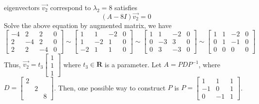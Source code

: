 \documentclass{article}
\begin{document}
eigenvectors $\Vec{v_2}$ correspond to $\lambda_2=8$ satisfies
\[(A-8I)\Vec{v_2}=0\]
Solve the above equation by augmented matrix, we have
\[\left[\begin{array}{rrrr}
-4 & 2 & 2 & 0 \\
2 & -4 & 2 & 0 \\
2 & 2 & -4 & 0
\end{array}\right]\sim\left[\begin{array}{rrrr}
1 & 1 & -2 & 0 \\
1 & -2 & 1 & 0 \\
-2 & 1 & 1 & 0
\end{array}\right]\sim \left[\begin{array}{rrrr}
1 & 1 & -2 & 0 \\
0 & -3 & 3 & 0 \\
0 & 3 & -3 & 0
\end{array}\right]\sim\left[\begin{array}{rrrr}
1 & 1 & -2 & 0 \\
0 & 1 & -1 & 0 \\
0 & 0 & 0 & 0
\end{array}\right]
\]
Thus, $\Vec{v_2}=t_3\left[\begin{array}{r} 1 \\ 1 \\ 1 \end{array}\right]$ where $t_3\in\mathbf{R}$ is a parameter. \newline
Let $A=PDP^{-1}$, where $D=\left[\begin{array}{rrr}
2\\ & 2 \\ && 8 
\end{array}\right]$.
Then, one possible way to construct $P$ is $P=\left[\begin{array}{rrr}
1 & 1 & 1 \\
-1 & 0 &1 \\ 0 & -1 & 1 \end{array}\right]$.
\end{document}
